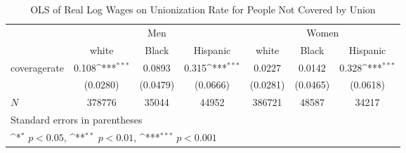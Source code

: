 \begin{table}[htbp]\centering
\def\sym#1{\ifmmode^{#1}\else\(^{#1}\)\fi}
\caption{OLS of Real Log Wages on Unionization Rate for People Not Covered by Union}
\begin{tabular}{l*{6}{c}}
\hline\hline
            &\multicolumn{3}{c}{Men}                                          &\multicolumn{3}{c}{Women}                                        \\\cmidrule(lr){2-4}\cmidrule(lr){5-7}
            &\multicolumn{1}{c}{white}&\multicolumn{1}{c}{Black}&\multicolumn{1}{c}{Hispanic}&\multicolumn{1}{c}{white}&\multicolumn{1}{c}{Black}&\multicolumn{1}{c}{Hispanic}\\
\hline
coveragerate&       0.108\sym{***}&      0.0893         &       0.315\sym{***}&      0.0227         &      0.0142         &       0.328\sym{***}\\
            &    (0.0280)         &    (0.0479)         &    (0.0666)         &    (0.0281)         &    (0.0465)         &    (0.0618)         \\
\hline
\(N\)       &      378776         &       35044         &       44952         &      386721         &       48587         &       34217         \\
\hline\hline
\multicolumn{7}{l}{\footnotesize Standard errors in parentheses}\\
\multicolumn{7}{l}{\footnotesize \sym{*} \(p<0.05\), \sym{**} \(p<0.01\), \sym{***} \(p<0.001\)}\\
\end{tabular}
\end{table}
